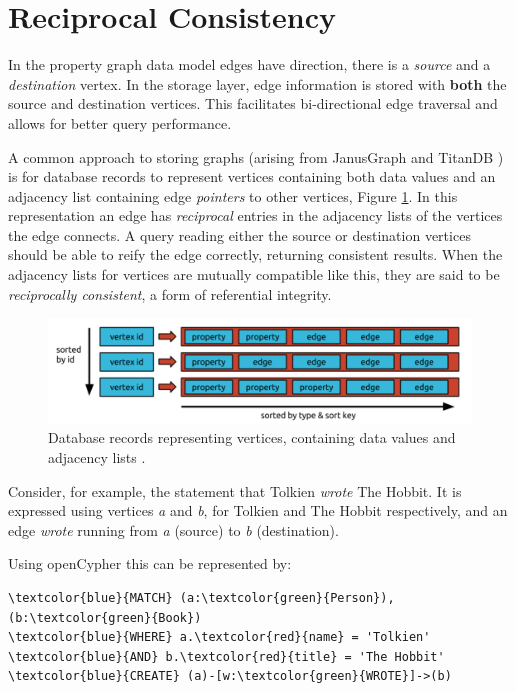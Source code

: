 \documentclass[sigplan,10pt]{acmart}
\begin{document}
\section{Reciprocal Consistency}
\label{sec:recipr-cons}

In the property graph data model edges have direction, there is a \emph{source} and a \emph{destination} vertex. In the storage layer, edge information is stored with \textbf{both} the source and destination vertices. This facilitates bi-directional edge traversal and allows for better query performance.

A common approach to storing graphs (arising from JanusGraph \cite{janusgraph} and TitanDB \cite{TitanDB}) is for database records to represent vertices containing both data values and an adjacency list containing edge \emph{pointers} to other vertices, Figure \ref{adj-list}. In this representation an edge has \emph{reciprocal} entries in the adjacency lists of the vertices the edge connects. A query reading either the source or destination vertices should be able to reify the edge correctly, returning consistent results. When the adjacency lists for vertices are mutually compatible like this, they are said to be \emph{reciprocally consistent}, a form of referential integrity.

\begin{figure}[ht]
  \centering
  \includegraphics[width=\linewidth]{./images/janusgraph-adj-list}
  \caption{Database records representing vertices, containing data values and adjacency lists \cite{janusgraph}.}
  \label{adj-list}
\end{figure}

Consider, for example, the statement that Tolkien \textit{wrote} The Hobbit. It is expressed using vertices \emph{a} and \emph{b}, for Tolkien and The Hobbit respectively, and an edge \textit{wrote} running from \emph{a} (source) to \emph{b} (destination).

Using openCypher \cite{openCypher} this can be represented by:
\begin{Verbatim}[commandchars=\\\{\},fontsize=\small,xleftmargin=.2in]
\textcolor{blue}{MATCH} (a:\textcolor{green}{Person}), (b:\textcolor{green}{Book})
\textcolor{blue}{WHERE} a.\textcolor{red}{name} = 'Tolkien' \textcolor{blue}{AND} b.\textcolor{red}{title} = 'The Hobbit'
\textcolor{blue}{CREATE} (a)-[w:\textcolor{green}{WROTE}]->(b)
\end{Verbatim}
\end{document}
